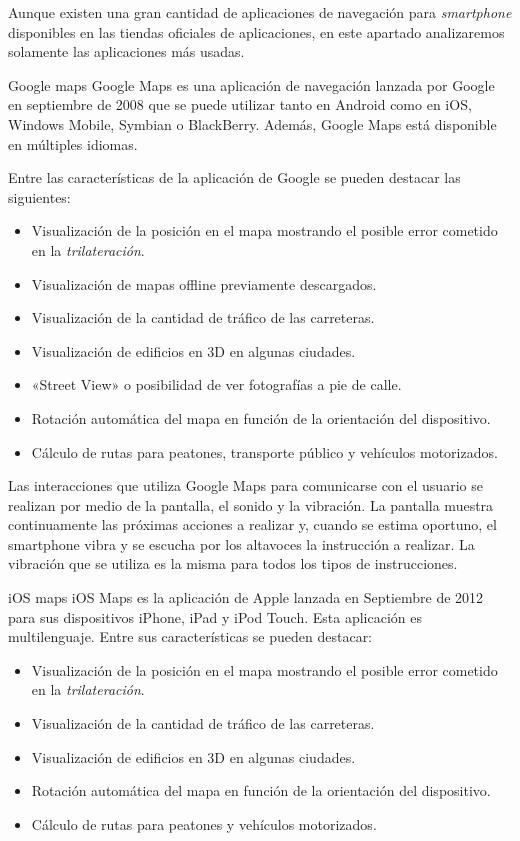 Aunque existen una gran cantidad de aplicaciones de navegación para \emph{smartphone} disponibles en
las tiendas oficiales de aplicaciones, en este apartado analizaremos solamente las aplicaciones más
usadas.

\begin{definitionlist}
  \item[Google maps] Google Maps es una aplicación de navegación lanzada por Google en septiembre de
    2008 que se puede utilizar tanto en Android como en iOS, Windows Mobile, Symbian o
    BlackBerry. Además, Google Maps está disponible en múltiples idiomas.

    Entre las características de la aplicación de Google se pueden destacar las siguientes:

    \begin{itemize}
      \item Visualización de la posición en el mapa mostrando el posible error cometido en la
        \emph{trilateración}.
      \item Visualización de mapas offline previamente descargados.
      \item Visualización de la cantidad de tráfico de las carreteras.
      \item Visualización de edificios en 3D en algunas ciudades.
      \item «Street View» o posibilidad de ver fotografías a pie de calle.
      \item Rotación automática del mapa en función de la orientación del dispositivo.
      \item Cálculo de rutas para peatones, transporte público y vehículos motorizados.
    \end{itemize}

    Las interacciones que utiliza Google Maps para comunicarse con el usuario se realizan por medio
    de la pantalla, el sonido y la vibración. La pantalla muestra continuamente las próximas
    acciones a realizar y, cuando se estima oportuno, el smartphone vibra y se escucha por los
    altavoces la instrucción a realizar. La vibración que se utiliza es la misma para todos los
    tipos de instrucciones.

  \item[iOS maps] iOS Maps es la aplicación de Apple lanzada en Septiembre de 2012 para sus
    dispositivos iPhone, iPad y iPod Touch. Esta aplicación es multilenguaje. Entre sus
    características se pueden destacar:

    \begin{itemize}
      \item Visualización de la posición en el mapa mostrando el posible error cometido en la
        \emph{trilateración}.
      \item Visualización de la cantidad de tráfico de las carreteras.
      \item Visualización de edificios en 3D en algunas ciudades.
      \item Rotación automática del mapa en función de la orientación del dispositivo.
      \item Cálculo de rutas para peatones y vehículos motorizados.
    \end{itemize}


\end{definitionlist}
